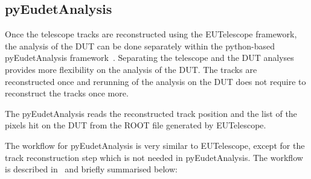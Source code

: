 \subsection{pyEudetAnalysis}
\label{sec:pyEudetAnalysis}

Once the telescope tracks are reconstructed using the EUTelescope
framework, the analysis of the DUT can be done separately within the
python-based pyEudetAnalysis framework~\cite{pyeudet}. Separating the
telescope and the DUT analyses provides more flexibility on the
analysis of the DUT. The tracks are reconstructed once and rerunning
of the analysis on the DUT does not require to reconstruct the tracks
once more.

The pyEudetAnalysis reads the reconstructed track position and the
list of the pixels hit on the DUT from the ROOT file generated by
EUTelescope.
 
The workflow for pyEudetAnalysis is very similar to EUTelescope,
except for the track reconstruction step which is not needed in
pyEudetAnalysis. The workflow is described
in~\cite{AlipourTehrani:2133128} and briefly summarised below:

